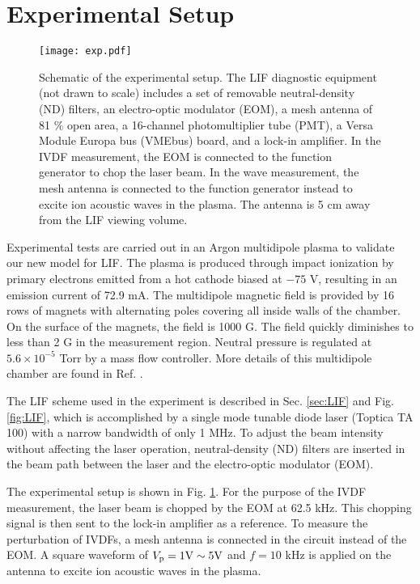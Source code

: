 \documentclass[aip,pop,reprint]{revtex4-1}
\begin{document}

\section{Experimental Setup}
\label{sec:exp}

\begin{figure}
\begin{center}
\texttt{[image: exp.pdf]}
\caption{Schematic of the experimental setup. The LIF diagnostic equipment (not drawn to scale) includes a set of removable neutral-density (ND) filters, an electro-optic modulator (EOM), a mesh antenna of 81 $\%$ open area, a 16-channel photomultiplier tube (PMT), a Versa Module Europa bus (VMEbus) board, and a lock-in amplifier. In the IVDF measurement, the EOM is connected to the function generator to chop the laser beam. In the wave measurement, the mesh antenna is connected to the function generator instead to excite ion acoustic waves in the plasma. The antenna is 5 cm away from the LIF viewing volume.}
\label{fig:exp}
\end{center}
\end{figure}

Experimental tests are carried out in an Argon multidipole plasma to validate our new model for LIF. The plasma is produced through impact ionization by primary electrons emitted from a hot cathode biased at $-75$ V, resulting in an emission current of 72.9 mA. The multidipole magnetic field is provided by 16 rows of magnets with alternating poles covering all inside walls of the chamber. On the surface of the magnets, the field is 1000 G. The field quickly diminishes to less than 2 G in the measurement region. Neutral pressure is regulated at $5.6 \times 10^{-5}$ Torr by a mass flow controller. More details of this multidipole chamber are found in Ref. .

The LIF scheme used in the experiment is described in Sec. \ref{sec:LIF} and Fig. \ref{fig:LIF}, which is accomplished by a single mode tunable diode laser (Toptica TA 100) with a narrow bandwidth of only 1 MHz. To adjust the beam intensity without affecting the laser operation, neutral-density (ND) filters are inserted in the beam path between the laser and the electro-optic modulator (EOM). 

The experimental setup is shown in Fig.  \ref{fig:exp}. For the purpose of the IVDF measurement, the laser beam is chopped by the EOM at 62.5 kHz. This chopping signal is then sent to the lock-in amplifier as a reference. To measure the perturbation of IVDFs, a mesh antenna is connected in the circuit instead of the EOM. A square waveform of $V_\textup{p}=1\textup{V} \sim 5\textup{V}$ and $f=10$ kHz is applied on the antenna to excite ion acoustic waves in the plasma.
\end{document}

